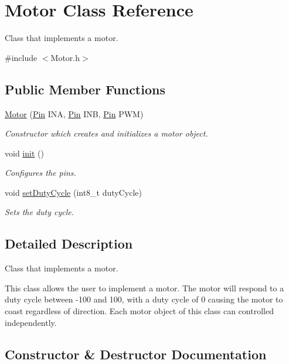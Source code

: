 \hypertarget{class_motor}{}\section{Motor Class Reference}
\label{class_motor}


Class that implements a motor.  




{\ttfamily \#include $<$Motor.\+h$>$}

\subsection*{Public Member Functions}
\begin{DoxyCompactItemize}
\item 
\mbox{\hyperlink{class_motor_ad037c65c0ec24556b7c7c367f42e3686}{Motor}} (\mbox{\hyperlink{struct_pin}{Pin}} I\+NA, \mbox{\hyperlink{struct_pin}{Pin}} I\+NB, \mbox{\hyperlink{struct_pin}{Pin}} P\+WM)
\begin{DoxyCompactList}\small\item\em Constructor which creates and initializes a motor object. \end{DoxyCompactList}\item 
void \mbox{\hyperlink{class_motor_ac33814c8814d6b576531149ee945516d}{init}} ()
\begin{DoxyCompactList}\small\item\em Configures the pins. \end{DoxyCompactList}\item 
void \mbox{\hyperlink{class_motor_aedb11319566abc8f5297454a0d6833c4}{set\+Duty\+Cycle}} (int8\+\_\+t duty\+Cycle)
\begin{DoxyCompactList}\small\item\em Sets the duty cycle. \end{DoxyCompactList}\end{DoxyCompactItemize}


\subsection{Detailed Description}
Class that implements a motor. 

This class allows the user to implement a motor. The motor will respond to a duty cycle between -\/100 and 100, with a duty cycle of 0 causing the motor to coast regardless of direction. Each motor object of this class can controlled independently. 

\subsection{Constructor \& Destructor Documentation}
\mbox{\label{class_motor_ad037c65c0ec24556b7c7c367f42e3686}} 
